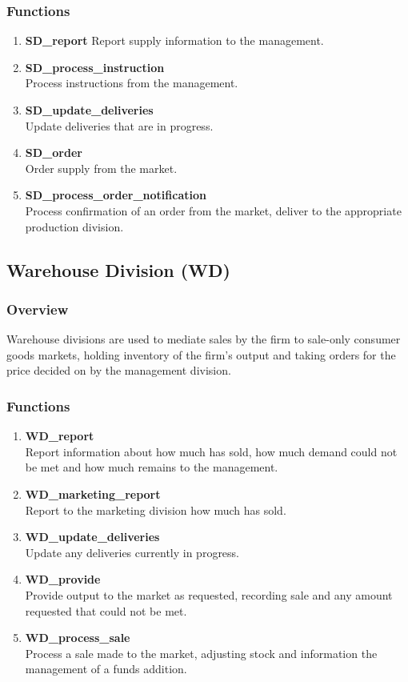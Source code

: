 \documentclass[11pt]{article}
\begin{document}
\subsubsection{Functions}
\begin{enumerate}
	\item \textbf{SD\_report}
	Report supply information to the management.
	\item \textbf{SD\_process\_instruction} \\
	Process instructions from the management.
	\item \textbf{SD\_update\_deliveries} \\
	Update deliveries that are in progress.
	\item \textbf{SD\_order} \\
	Order supply from the market.
	\item \textbf{SD\_process\_order\_notification} \\
	Process confirmation of an order from the market, deliver to the appropriate production division.
\end{enumerate}

\subsection{Warehouse Division (WD)}

\subsubsection{Overview}
Warehouse divisions are used to mediate sales by the firm to sale-only consumer goods markets, holding inventory of the firm's output and taking orders for the price decided on by the management division.

\subsubsection{Functions}
\begin{enumerate}
	\item \textbf{WD\_report} \\
	Report information about how much has sold, how much demand could not be met and how much remains to the management.
	\item \textbf{WD\_marketing\_report} \\
	Report to the marketing division how much has sold.
	\item \textbf{WD\_update\_deliveries} \\
	Update any deliveries currently in progress.
	\item \textbf{WD\_provide} \\
	Provide output to the market as requested, recording sale and any amount requested that could not be met.
	\item \textbf{WD\_process\_sale} \\
	Process a sale made to the market, adjusting stock and information the management of a funds addition.
\end{enumerate}
\end{document}
